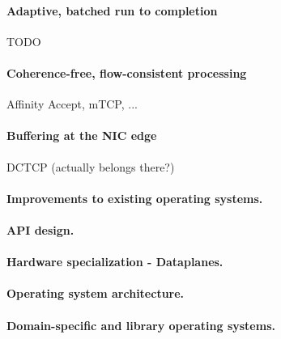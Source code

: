 \paragraph{Adaptive, batched run to completion}

\todo TODO

\paragraph{Coherence-free, flow-consistent processing}

\todo Affinity Accept, mTCP, ...

\paragraph{Buffering at the NIC edge}

\todo DCTCP (actually belongs there?)


\paragraph{Improvements to existing operating systems.}

\paragraph{API design.}


\paragraph{Hardware specialization - Dataplanes.}

\paragraph{Operating system architecture.}

\paragraph{Domain-specific and library operating systems.}


